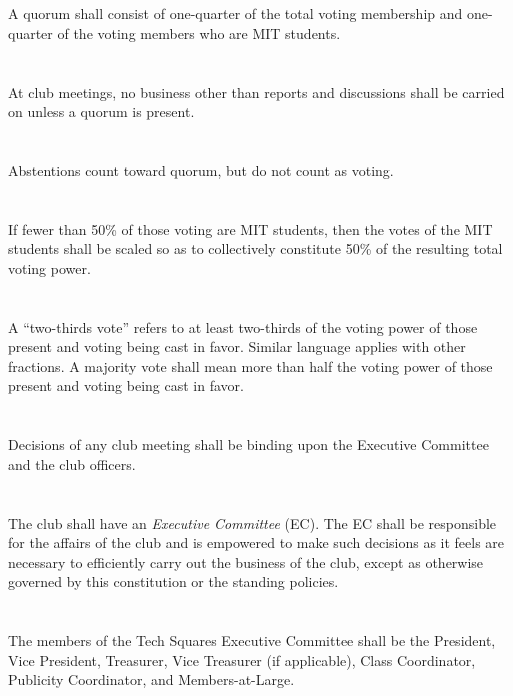 \documentclass{bylaws}
\begin{document}
\section{}A quorum shall consist of one-quarter of the total voting membership and one-quarter of the voting members who are MIT students.
\section{}At club meetings, no business other than reports and discussions shall be carried on unless a quorum is present.
\section{}Abstentions count toward quorum, but do not count as voting.
\section{}If fewer than 50\% of those voting are MIT students, then the votes of the MIT students shall be scaled so as to collectively constitute 50\% of the resulting total voting power.
\section{}A ``two-thirds vote'' refers to at least two-thirds of the voting power of those present and voting being cast in favor. Similar language applies with other fractions. A majority vote shall mean more than half the voting power of those present and voting being cast in favor.
\section{}Decisions of any club meeting shall be binding upon the Executive Committee
and the club officers.


\section{}The club shall have an \textit{Executive Committee} (EC). The EC shall be responsible for the affairs of the club and is empowered to make such decisions as it feels are necessary to efficiently carry out the business of the club, except as otherwise governed by this constitution or the standing policies.
\section{}The members of the Tech Squares Executive Committee shall be the President, Vice President, Treasurer, Vice Treasurer (if applicable), Class Coordinator, Publicity Coordinator, and Members-at-Large.
\end{document}
